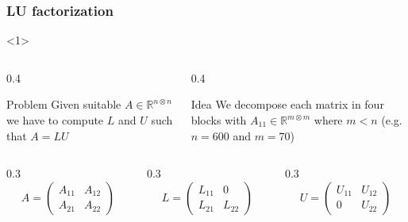 \documentclass[10pt]{beamer}
\theoremstyle{definition}
\begin{document}
\begin{frame}
\frametitle{LU factorization}

\begin{onlyenv}<1>
\begin{columns}
\begin{column}{0.4\framewidth}
\begin{block}{Problem}
Given suitable $A\in\mathbb{R}^{n\otimes n}$ we have to compute $L$ and $U$ such that $A=LU$
\end{block}
\end{column}
\begin{column}{0.4\framewidth}
\begin{block}{Idea}
We decompose each matrix in four blocks with $A_{11}\in\mathbb{R}^{m\otimes m}$ where $m<n$ (e.g. $n=600$ and $m=70$)
\end{block}
\end{column}
\end{columns}

\begin{columns}
\begin{column}{0.3\framewidth}
\[
A=\left(
\begin{array}{c|c}
A_{11} & A_{12} \\
\hline
A_{21} & A_{22}
\end{array}
\right)
\]
\end{column}
\begin{column}{0.3\framewidth}
\[
L=\left(
\begin{array}{c|c}
L_{11} & 0 \\
\hline
L_{21} & L_{22}
\end{array}
\right)
\]
\end{column}
\begin{column}{0.3\framewidth}
\[
U=\left(
\begin{array}{c|c}
U_{11} & U_{12} \\
\hline
0 & U_{22}
\end{array}
\right)
\]
\end{column}
\end{columns}
\end{onlyenv}


\end{frame}
\end{document}
